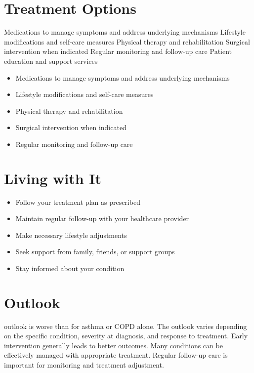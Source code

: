 \section{Treatment Options}
Medications to manage symptoms and address underlying mechanisms Lifestyle modifications and self-care measures Physical therapy and rehabilitation Surgical intervention when indicated Regular monitoring and follow-up care Patient education and support services

\begin{itemize}[noitemsep]
  \item Medications to manage symptoms and address underlying mechanisms
  \item Lifestyle modifications and self-care measures
  \item Physical therapy and rehabilitation
  \item Surgical intervention when indicated
  \item Regular monitoring and follow-up care
\end{itemize}
\section{Living with It}
\begin{itemize}[noitemsep]
  \item Follow your treatment plan as prescribed
  \item Maintain regular follow-up with your healthcare provider
  \item Make necessary lifestyle adjustments
  \item Seek support from family, friends, or support groups
  \item Stay informed about your condition
\end{itemize}
\section{Outlook}
outlook is worse than for asthma or COPD alone. The outlook varies depending on the specific condition, severity at diagnosis, and response to treatment. Early intervention generally leads to better outcomes. Many conditions can be effectively managed with appropriate treatment. Regular follow-up care is important for monitoring and treatment adjustment.
